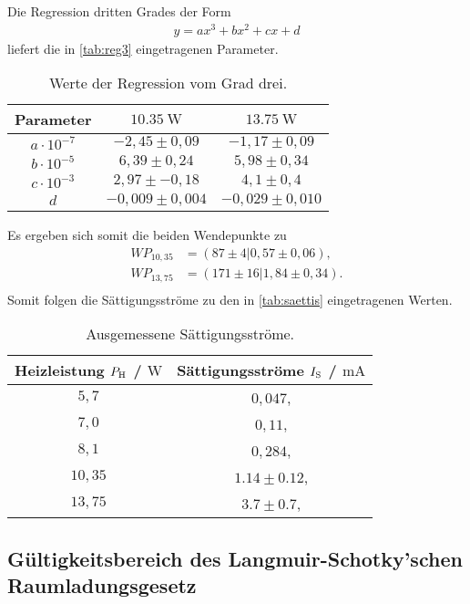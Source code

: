 \noindent
Die Regression dritten Grades der Form
\begin{align*}
  y = ax^3+bx^2+cx+d  
\end{align*}
liefert die in \autoref{tab:reg3} eingetragenen Parameter.

\begin{table}[H]
  \caption{Werte der Regression vom Grad drei.}
  \label{tab:reg3}
  \centering
  \begin{tabular}{c c c}
      \toprule
      Parameter & $\SI{10,35}{\watt}$ & $\SI{13,75}{\watt}$ \\
      \midrule
      $a \cdot 10^{-7}$ & $-2,45 \pm 0,09$ & $-1,17 \pm 0,09$ \\
      $b \cdot 10^{-5}$ & $6,39 \pm 0,24$ & $5,98 \pm 0,34$ \\
      $c \cdot 10^{-3}$ & $2,97 \pm -0,18$ & $4,1 \pm 0,4$ \\
      $d$ & $-0,009 \pm 0,004$ & $-0,029 \pm 0,010$ \\
      \bottomrule
    \end{tabular}
\end{table}

\noindent
Es ergeben sich somit die beiden Wendepunkte zu
\begin{align*}
  WP_{10,35} &= (87 \pm 4 | 0,57 \pm 0,06), \\
  WP_{13,75} &= (171 \pm 16 | 1,84 \pm 0,34). \\
\end{align*}
Somit folgen die Sättigungsströme zu den in \autoref{tab:saettis} eingetragenen Werten.

\begin{table}[H]
  \caption{Ausgemessene Sättigungsströme.}
  \label{tab:saettis}
  \centering
  \begin{tabular}{c c}
      \toprule
      Heizleistung $P_{\text H}$ / $\si{\watt}$ & Sättigungsströme $I_{\text S}$ / $\si{\milli\ampere}$ \\
      \midrule
      $5,7$   & $0,047$, \\
      $7,0$   & $0,11$, \\
      $8,1$   & $0,284$, \\
      $10,35$ & $1.14 \pm 0.12$, \\
      $13,75$ & $3.7 \pm 0.7$, \\
      \bottomrule
    \end{tabular}
\end{table}

\subsection{Gültigkeitsbereich des Langmuir-Schotky'schen Raumladungsgesetz}
\label{subsec:langmuirSchottky}

